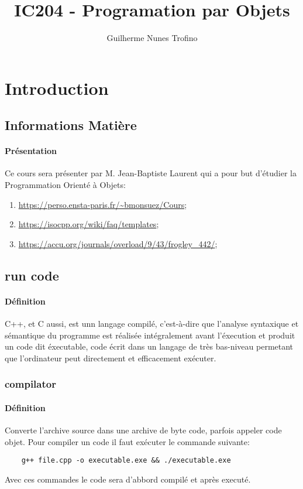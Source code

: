 \documentclass{article}
\title{IC204 - Programation par Objets}
\author{Guilherme Nunes Trofino}
\begin{document}
\maketitle

\newpage\tableofcontents

\section{Introduction}

% 


\subsection{Informations Matière}
\paragraph{Présentation}Ce cours sera présenter par M. Jean-Baptiste Laurent qui a pour but d'étudier la Programmation Orienté à Objets:
\begin{enumerate}[noitemsep]
    \item \url{https://perso.ensta-paris.fr/~bmonsuez/Cours};
    \item \url{https://isocpp.org/wiki/faq/templates};
    \item \url{https://accu.org/journals/overload/9/43/frogley_442/};
\end{enumerate}


\subsection{run code}
\paragraph{Définition}C++, et C aussi, est unn langage compilé, c'est-à-dire que l'analyse syntaxique et sémantique du programme est réalisée intégralement avant l'éxecution et produit un code dit éxecutable, code écrit dans un langage de très bas-niveau permetant que l'ordinateur peut directement et efficacement exécuter.\\

\subsubsection{compilator}
\paragraph{Définition}Converte l'archive source dans une archive de byte code, parfois appeler code objet. Pour compiler un code il faut exécuter le commande suivante:
\begin{scriptsize}
    \mycode
    \begin{lstlisting}
    g++ file.cpp -o executable.exe && ./executable.exe
    \end{lstlisting}
\end{scriptsize}
Avec ces commandes le code sera d'abbord compilé et après executé.
\end{document}
